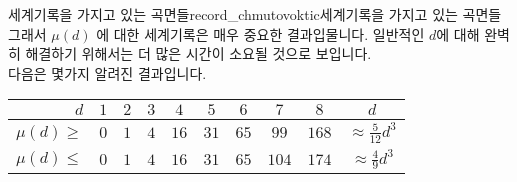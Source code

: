 \begin{surferIntroPage}{세계기록을 가지고 있는 곡면들}{record_chmutovoktic}{세계기록을 가지고 있는 곡면들}
그래서 $\mu(d)$ 에 대한 세계기록은 매우 중요한 결과입물니다. 일반적인 $d$에 대해 완벽히 해결하기 위해서는 더 많은 시간이 소요될 것으로 보입니다. \\  다음은 몇가지 알려진 결과입니다.  
    
   \begin{center}
      \begin{tabular}{r|cccccccc|c}
        $d$ & $1$ & $2$ & $3$ & $4$ & $5$ & $6$ & $7$ & $8$ & $d$\\
        \hline
        \hline
        \rule{0pt}{1.2em}$\mu(d)\ge$ & $0$ & $1$ & $4$ & $16$ & $31$ & $65$ &
        $99$ & $168$ & 
        $\approx \frac{5}{12}d^3$\\[0.3em]
        \hline
        \rule{0pt}{1.2em}$\mu(d)\le$ & $0$ & $1$ & $4$ & $16$ & $31$ & $65$ &
        $104$ & $174$ & $\approx \frac{4}{9}d^3$
      \end{tabular}
    \end{center}
\end{surferIntroPage}
